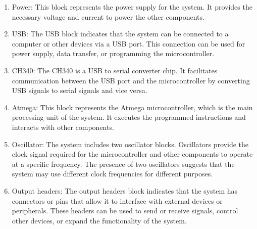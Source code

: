 \documentclass[a4paper,11pt]{article}%
\begin{document}
\begin{enumerate}
	\item Power: This block represents the power supply for the system. It provides the necessary voltage and current to power the other components.
	\item USB: The USB block indicates that the system can be connected to a computer or other devices via a USB port. This connection can be used for power supply, data transfer, or programming the microcontroller.
	\item CH340: The CH340 is a USB to serial converter chip. It facilitates communication between the USB port and the microcontroller by converting USB signals to serial signals and vice versa.
	\item Atmega: This block represents the Atmega microcontroller, which is the main processing unit of the system. It executes the programmed instructions and interacts with other components.
	\item Oscillator: The system includes two oscillator blocks. Oscillators provide the clock signal required for the microcontroller and other components to operate at a specific frequency. The presence of two oscillators suggests that the system may use different clock frequencies for different purposes.
	\item Output headers: The output headers block indicates that the system has connectors or pins that allow it to interface with external devices or peripherals. These headers can be used to send or receive signals, control other devices, or expand the functionality of the system.
\end{enumerate}
\end{document}
